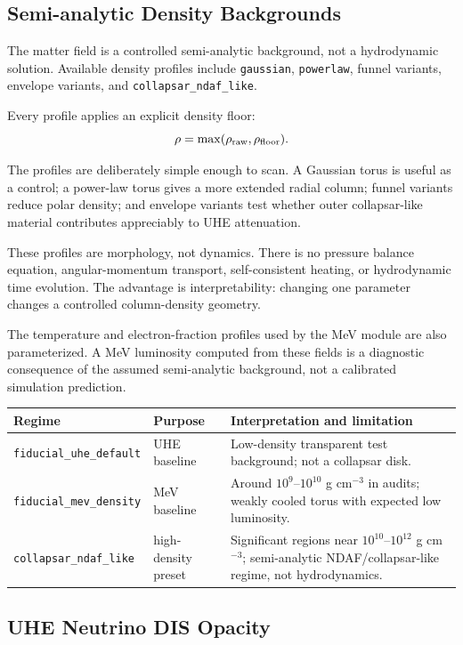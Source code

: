 \documentclass[11pt,a4paper]{article}
\begin{document}
\subsection{Semi-analytic Density Backgrounds}

The matter field is a controlled semi-analytic background, not a hydrodynamic
solution. Available density profiles include \texttt{gaussian},
\texttt{powerlaw}, funnel variants, envelope variants, and
\texttt{collapsar\_ndaf\_like}.

Every profile applies an explicit density floor:
\[
\rho = \max(\rho_{\rm raw},\rho_{\rm floor}).
\]

The profiles are deliberately simple enough to scan. A Gaussian torus is useful
as a control; a power-law torus gives a more extended radial column; funnel
variants reduce polar density; and envelope variants test whether outer
collapsar-like material contributes appreciably to UHE attenuation.

These profiles are morphology, not dynamics. There is no pressure balance
equation, angular-momentum transport, self-consistent heating, or hydrodynamic
time evolution. The advantage is interpretability: changing one parameter
changes a controlled column-density geometry.

The temperature and electron-fraction profiles used by the MeV module are also
parameterized. A MeV luminosity computed from these fields is a diagnostic
consequence of the assumed semi-analytic background, not a calibrated
simulation prediction.

\begin{longtable}{p{}p{}p{}}
\toprule
Regime & Purpose & Interpretation and limitation\\
\midrule
\texttt{fiducial\_uhe\_default} & UHE baseline & Low-density transparent test background; not a collapsar disk.\\
\texttt{fiducial\_mev\_density} & MeV baseline & Around $10^9$--$10^{10}$ g cm$^{-3}$ in audits; weakly cooled torus with expected low luminosity.\\
\texttt{collapsar\_ndaf\_like} & high-density preset & Significant regions near $10^{10}$--$10^{12}$ g cm$^{-3}$; semi-analytic NDAF/collapsar-like regime, not hydrodynamics.\\
\bottomrule
\end{longtable}

\subsection{UHE Neutrino DIS Opacity}
\end{document}
